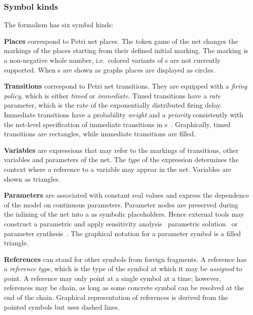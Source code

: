 \subsubsection{Symbol kinds}

The  formalism has six symbol kinds:

\newpara\textbf{Places} correspond to Petri net places. The token game of the net changes the markings of the places starting from their defined initial marking. The marking is a non-negative whole number, i.e.~colored variants of s are not currently supported. When s are shown as graphs places are displayed as circles.

\newpara \textbf{Transitions} correspond to Petri net transitions. They are equipped with a \emph{firing policy}, which is either \emph{timed} or \emph{immediate}. Timed transitions have a \emph{rate} parameter, which is the rate of the exponentially distributed firing delay. Immediate transitions have a probability \emph{weight} and a \emph{priority} consistently with the net-level specification of immediate transitions in s~\citep{Teruel03netlevel}. Graphically, timed transitions are rectangles, while immediate transitions are filled.

\newpara \textbf{Variables} are expressions that may refer to the markings of transitions, other variables and parameters of the net. The \emph{type} of the expression determines the context where a reference to a variable may appear in the net. Variables are shown as triangles.

\newpara \textbf{Parameters} are associated with constant real values and express the dependence of the model on continuous parameters. Parameter nodes are preserved during the inlining of the net into a  as symbolic placeholders. Hence external tools may construct a parametric  and apply sensitivity analysis~\citep{Blake88sensitivity} parametric solution~\citep{Hahn11parametric,Voros17pdn} or parameter synthesis~\citep{Quatmann16mdp}. The graphical notation for a parameter symbol is a filled triangle.

\newpara \textbf{References} can stand for other symbols from foreign  fragments. A reference has a \emph{reference type}, which is the type of the symbol at which it may be \emph{assigned} to point. A reference may only point at a single symbol at a time; however, references may be chain, as long as some concrete symbol can be resolved at the end of the chain. Graphical representation of references is derived from the pointed symbols but uses dashed lines.

